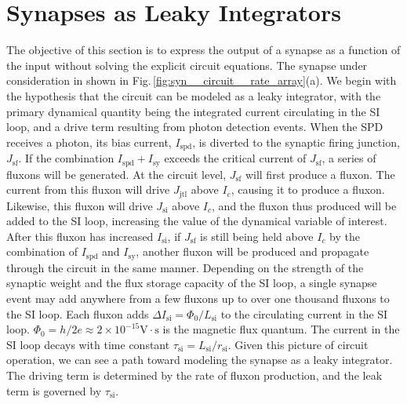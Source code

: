 \documentclass[twocolumn]{article}
\begin{document}
\section{\label{sec:synapses}Synapses as Leaky Integrators}
The objective of this section is to express the output of a synapse as a function of the input without solving the explicit circuit equations. The synapse under consideration in shown in Fig.\,\ref{fig:syn__circuit__rate_array}(a). We begin with the hypothesis that the circuit can be modeled as a leaky integrator, with the primary dynamical quantity being the integrated current circulating in the SI loop, and a drive term resulting from photon detection events. When the SPD receives a photon, its bias current, $I_{\mathrm{spd}}$, is diverted to the synaptic firing junction, $J_{\mathrm{sf}}$. If the combination $I_{\mathrm{spd}}+I_{\mathrm{sy}}$ exceeds the critical current of $J_{\mathrm{sf}}$, a series of fluxons will be generated. At the circuit level, $J_{\mathrm{sf}}$ will first produce a fluxon. The current from this fluxon will drive $J_{\mathrm{jtl}}$ above $I_c$, causing it to produce a fluxon. Likewise, this fluxon will drive $J_{\mathrm{si}}$ above $I_c$, and the fluxon thus produced will be added to the SI loop, increasing the value of the dynamical variable of interest. After this fluxon has increased $I_{\mathrm{si}}$, if $J_{\mathrm{sf}}$ is still being held above $I_c$ by the combination of $I_{\mathrm{spd}}$ and $I_{\mathrm{sy}}$, another fluxon will be produced and propagate through the circuit in the same manner. Depending on the strength of the synaptic weight and the flux storage capacity of the SI loop, a single synapse event may add anywhere from a few fluxons up to over one thousand fluxons to the SI loop. Each fluxon adds $\Delta I_{\mathrm{si}} = \Phi_0/L_{\mathrm{si}}$ to the circulating current in the SI loop. $\Phi_0 = h/2e \approx 2\times10^{-15}\mathrm{V}\cdot\mathrm{s}$ is the magnetic flux quantum. The current in the SI loop decays with time constant $\tau_{\mathrm{si}} = L_{\mathrm{si}}/r_{\mathrm{si}}$. Given this picture of circuit operation, we can see a path toward modeling the synapse as a leaky integrator. The driving term is determined by the rate of fluxon production, and the leak term is governed by $\tau_{\mathrm{si}}$.
\end{document}

